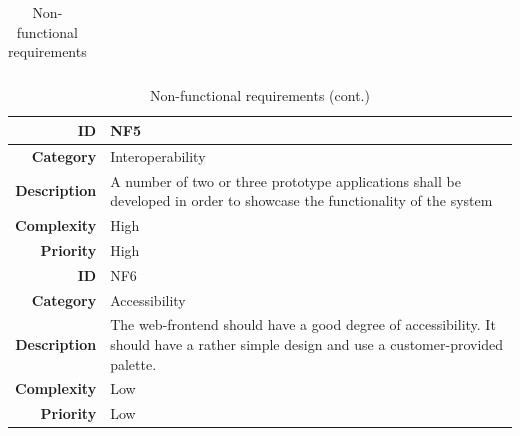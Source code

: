\begin{table}[H]
\begin{center}
\begin{tabular}{ | r | p{11.5cm} | }
  \hline
\end{tabular}
\end{center}
\caption{Non-functional requirements}
\label{table:nonfunc}
\end{table}

\begin{table}[H]
\begin{center}
\begin{tabular}{ | r | p{11.5cm} | }
	\hline

  \textbf{ID} & NF5 \\
  \hline\noalign{\smallskip}\hline
  \textbf{Category}     & Interoperability \\
  \textbf{Description}  & A number of two or three prototype applications shall be developed in order to showcase
                          the functionality of the system \\
  \textbf{Complexity}   & High \\
  \textbf{Priority}     & High \\
  \hline\noalign{\smallskip}\noalign{\smallskip}\hline
	
	\textbf{ID} & NF6 \\
  \hline\noalign{\smallskip}\hline
  \textbf{Category}			&	Accessibility \\
  \textbf{Description}	& The web-frontend should have a good degree of accessibility.
  												It should have a rather simple design and use a customer-provided palette. \\
  \textbf{Complexity}		& Low \\
  \textbf{Priority}			& Low \\
	
	\hline
\end{tabular}
\end{center}
\caption{Non-functional requirements (cont.)}
\end{table}

